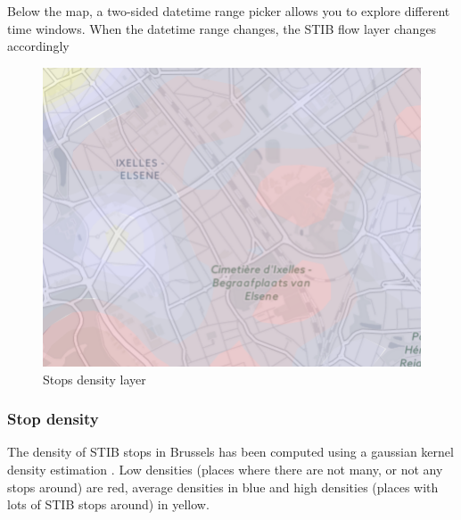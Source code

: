 \documentclass[11pt]{article}%
\begin{document}
Below the map, a two-sided datetime range picker allows you to explore different time windows. When the datetime range changes, the STIB flow layer changes accordingly

\begin{minipage}{0.3\textwidth}
  \begin{figure}[H]
    \includegraphics[width=\textwidth]{images/area.png}
    \caption{Stops density layer}
  \end{figure}
\end{minipage}\hfill
\begin{minipage}{0.6\textwidth}
  \subsubsection{Stop density}
  The density of STIB stops in Brussels has been computed using a gaussian kernel density estimation \cite{kdewiki}. Low densities (places where there are not many, or not any stops around) are red, average densities in blue and high densities (places with lots of STIB stops around) in yellow.
\end{minipage}
\end{document}
